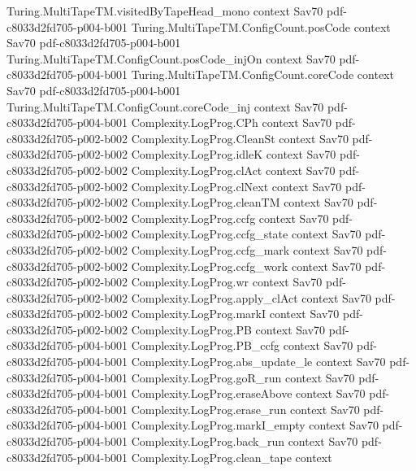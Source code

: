 \begin{theorem}
\proofstep
  {Turing.MultiTapeTM.visitedByTapeHead_mono}
  {context}
  {Sav70}
  {pdf-c8033d2fd705-p004-b001}
\proofstep
  {Turing.MultiTapeTM.ConfigCount.posCode}
  {context}
  {Sav70}
  {pdf-c8033d2fd705-p004-b001}
\proofstep
  {Turing.MultiTapeTM.ConfigCount.posCode_injOn}
  {context}
  {Sav70}
  {pdf-c8033d2fd705-p004-b001}
\proofstep
  {Turing.MultiTapeTM.ConfigCount.coreCode}
  {context}
  {Sav70}
  {pdf-c8033d2fd705-p004-b001}
\proofstep
  {Turing.MultiTapeTM.ConfigCount.coreCode_inj}
  {context}
  {Sav70}
  {pdf-c8033d2fd705-p004-b001}
\proofstep
  {Complexity.LogProg.CPh}
  {context}
  {Sav70}
  {pdf-c8033d2fd705-p002-b002}
\proofstep
  {Complexity.LogProg.CleanSt}
  {context}
  {Sav70}
  {pdf-c8033d2fd705-p002-b002}
\proofstep
  {Complexity.LogProg.idleK}
  {context}
  {Sav70}
  {pdf-c8033d2fd705-p002-b002}
\proofstep
  {Complexity.LogProg.clAct}
  {context}
  {Sav70}
  {pdf-c8033d2fd705-p002-b002}
\proofstep
  {Complexity.LogProg.clNext}
  {context}
  {Sav70}
  {pdf-c8033d2fd705-p002-b002}
\proofstep
  {Complexity.LogProg.cleanTM}
  {context}
  {Sav70}
  {pdf-c8033d2fd705-p002-b002}
\proofstep
  {Complexity.LogProg.ccfg}
  {context}
  {Sav70}
  {pdf-c8033d2fd705-p002-b002}
\proofstep
  {Complexity.LogProg.ccfg_state}
  {context}
  {Sav70}
  {pdf-c8033d2fd705-p002-b002}
\proofstep
  {Complexity.LogProg.ccfg_mark}
  {context}
  {Sav70}
  {pdf-c8033d2fd705-p002-b002}
\proofstep
  {Complexity.LogProg.ccfg_work}
  {context}
  {Sav70}
  {pdf-c8033d2fd705-p002-b002}
\proofstep
  {Complexity.LogProg.wr}
  {context}
  {Sav70}
  {pdf-c8033d2fd705-p002-b002}
\proofstep
  {Complexity.LogProg.apply_clAct}
  {context}
  {Sav70}
  {pdf-c8033d2fd705-p002-b002}
\proofstep
  {Complexity.LogProg.markI}
  {context}
  {Sav70}
  {pdf-c8033d2fd705-p002-b002}
\proofstep
  {Complexity.LogProg.PB}
  {context}
  {Sav70}
  {pdf-c8033d2fd705-p004-b001}
\proofstep
  {Complexity.LogProg.PB_ccfg}
  {context}
  {Sav70}
  {pdf-c8033d2fd705-p004-b001}
\proofstep
  {Complexity.LogProg.abs_update_le}
  {context}
  {Sav70}
  {pdf-c8033d2fd705-p004-b001}
\proofstep
  {Complexity.LogProg.goR_run}
  {context}
  {Sav70}
  {pdf-c8033d2fd705-p004-b001}
\proofstep
  {Complexity.LogProg.eraseAbove}
  {context}
  {Sav70}
  {pdf-c8033d2fd705-p004-b001}
\proofstep
  {Complexity.LogProg.erase_run}
  {context}
  {Sav70}
  {pdf-c8033d2fd705-p004-b001}
\proofstep
  {Complexity.LogProg.markI_empty}
  {context}
  {Sav70}
  {pdf-c8033d2fd705-p004-b001}
\proofstep
  {Complexity.LogProg.back_run}
  {context}
  {Sav70}
  {pdf-c8033d2fd705-p004-b001}
\proofstep
  {Complexity.LogProg.clean_tape}
  {context}

\end{theorem}
